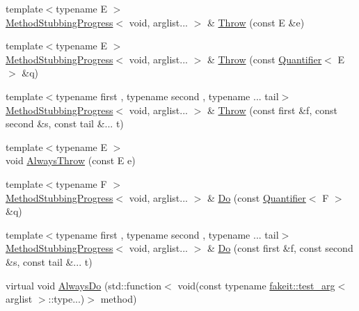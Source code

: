 \begin{DoxyCompactItemize}
\item 
{\footnotesize template$<$typename E $>$ }\\\mbox{\hyperlink{structfakeit_1_1MethodStubbingProgress}{Method\+Stubbing\+Progress}}$<$ void, arglist... $>$ \& \mbox{\hyperlink{structfakeit_1_1MethodStubbingProgress_3_01void_00_01arglist_8_8_8_01_4_a8b0d920dc6424eadd7dce7cb9df66814}{Throw}} (const E \&e)
\item 
{\footnotesize template$<$typename E $>$ }\\\mbox{\hyperlink{structfakeit_1_1MethodStubbingProgress}{Method\+Stubbing\+Progress}}$<$ void, arglist... $>$ \& \mbox{\hyperlink{structfakeit_1_1MethodStubbingProgress_3_01void_00_01arglist_8_8_8_01_4_a9eb6f25dd382ef939b775345205f42c1}{Throw}} (const \mbox{\hyperlink{structfakeit_1_1Quantifier}{Quantifier}}$<$ E $>$ \&q)
\item 
{\footnotesize template$<$typename first , typename second , typename ... tail$>$ }\\\mbox{\hyperlink{structfakeit_1_1MethodStubbingProgress}{Method\+Stubbing\+Progress}}$<$ void, arglist... $>$ \& \mbox{\hyperlink{structfakeit_1_1MethodStubbingProgress_3_01void_00_01arglist_8_8_8_01_4_a2db97b61a39cc6cecc379f6d51234c8a}{Throw}} (const first \&f, const second \&s, const tail \&... t)
\item 
{\footnotesize template$<$typename E $>$ }\\void \mbox{\hyperlink{structfakeit_1_1MethodStubbingProgress_3_01void_00_01arglist_8_8_8_01_4_ad42a19c184f5efba2f997b30f57b9a24}{Always\+Throw}} (const E e)
\item 
{\footnotesize template$<$typename F $>$ }\\\mbox{\hyperlink{structfakeit_1_1MethodStubbingProgress}{Method\+Stubbing\+Progress}}$<$ void, arglist... $>$ \& \mbox{\hyperlink{structfakeit_1_1MethodStubbingProgress_3_01void_00_01arglist_8_8_8_01_4_a3091661d404ffecf2733281471d536c4}{Do}} (const \mbox{\hyperlink{structfakeit_1_1Quantifier}{Quantifier}}$<$ F $>$ \&q)
\item 
{\footnotesize template$<$typename first , typename second , typename ... tail$>$ }\\\mbox{\hyperlink{structfakeit_1_1MethodStubbingProgress}{Method\+Stubbing\+Progress}}$<$ void, arglist... $>$ \& \mbox{\hyperlink{structfakeit_1_1MethodStubbingProgress_3_01void_00_01arglist_8_8_8_01_4_a45b048006587b626f8220aa4b196de2a}{Do}} (const first \&f, const second \&s, const tail \&... t)
\item 
virtual void \mbox{\hyperlink{structfakeit_1_1MethodStubbingProgress_3_01void_00_01arglist_8_8_8_01_4_a3e7ae0c7da9cc0eb29d499b889805eb9}{Always\+Do}} (std\+::function$<$ void(const typename \mbox{\hyperlink{structfakeit_1_1test__arg}{fakeit\+::test\+\_\+arg}}$<$ arglist $>$\+::type...)$>$ method)

\end{DoxyCompactItemize}
